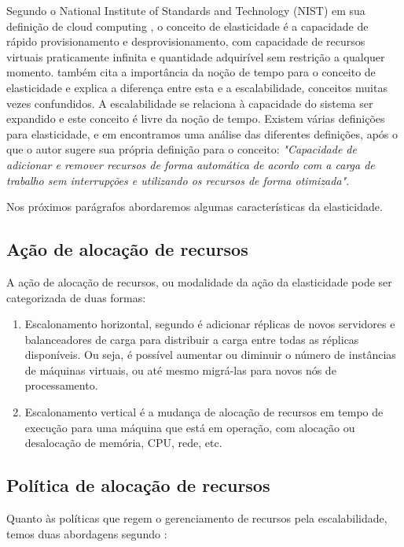 \documentclass[twoside,english,brazilian]{UNISINOSmonografia}
\begin{document}
Segundo o National Institute of Standards and Technology (NIST) em sua definição de cloud computing \cite{Mell2012}, o conceito de elasticidade é a capacidade de rápido provisionamento e desprovisionamento, com capacidade de recursos virtuais praticamente infinita e quantidade adquirível sem restrição a qualquer momento. \citep{Righi2013} também cita a importância da noção de tempo para o conceito de elasticidade e explica a diferença entre esta e a escalabilidade, conceitos muitas vezes confundidos. A escalabilidade se relaciona à capacidade do sistema ser expandido e este conceito é livre da noção de tempo.
Existem várias definições para elasticidade, e em \cite{coutinho} encontramos uma análise das diferentes definições, após o que o autor sugere sua própria definição para o conceito: \textit{"Capacidade de adicionar e remover recursos de forma automática de acordo com a carga de trabalho sem interrupções e utilizando os recursos de forma otimizada"}.

Nos próximos parágrafos abordaremos algumas características da elasticidade.

\subsection{Ação de alocação de recursos}
A ação de alocação de recursos, ou modalidade da ação da elasticidade pode ser categorizada de duas formas: 

\begin{enumerate}
	\item Escalonamento horizontal, segundo \cite{Lorido-botr2012} é adicionar réplicas de novos servidores e balanceadores de carga para distribuir a carga entre todas as réplicas disponíveis. Ou seja, é possível aumentar ou diminuir o número de instâncias de máquinas virtuais, ou até mesmo migrá-las para novos nós de processamento.
	\item Escalonamento vertical é a mudança de alocação de recursos em tempo de execução para uma máquina que está em operação, com alocação ou desalocação de memória, CPU, rede, etc.
\end{enumerate}

\subsection{Política de alocação de recursos}
Quanto às políticas que regem o gerenciamento de recursos pela escalabilidade, temos duas abordagens segundo \cite{Galante2012}:
\end{document}
